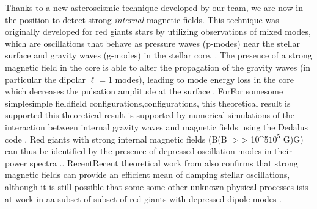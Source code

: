 Thanks to a new asteroseismic technique developed by our team, we are now in the position to detect strong {\it internal} magnetic fields. This technique was originally developed for red giants stars by utilizing observations of mixed modes, which are oscillations that behave as pressure waves (p-modes) near the stellar surface and gravity waves (g-modes) in the stellar core. \citep[e.g][]{Beck_2011}. The presence of a strong magnetic field in the core is able to alter the propagation of the gravity waves (in particular the dipolar $\ell =1$ modes),
leading to mode energy loss in the core which decreases the pulsation amplitude at the surface \citep{Fuller_2015}. ForFor somesome simplesimple fieldfield configurations,configurations, this theoretical result is supported  this theoretical result is supported  by numerical simulations of the interaction between internal gravity waves and magnetic fields using the Dedalus code \citep{Lecoanet_2016}. Red giants with strong internal magnetic fields (B(B $>$> 10^5$10^5$ G)G) can thus be identified by the presence of depressed oscillation modes in their power spectra \citep{Fuller_2015,Stello_2016}.\citep{Fuller_2015,Stello_2016}. RecentRecent theoretical work from \citet{2017MNRAS.467.3212L} also confirms that  strong magnetic fields can provide an efficient mean of damping stellar oscillations,  although it is still possible that some some other unknown physical processes isis at work in aa subset of subset of red giants with depressed dipole modes \citet{Mosser_2017}.
